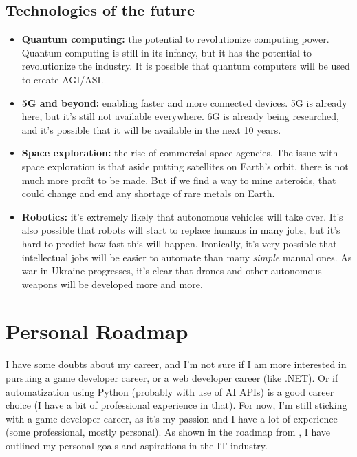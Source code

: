\documentclass{article}
\begin{document}
\subsection{Technologies of the future}
\begin{itemize}
    \item \textbf{Quantum computing:} the potential to revolutionize computing power. Quantum computing is still in its infancy, but it has the potential to revolutionize the industry. It is possible that quantum computers will be used to create AGI/ASI.
    \item \textbf{5G and beyond:} enabling faster and more connected devices. 5G is already here, but it's still not available everywhere. 6G is already being researched, and it's possible that it will be available in the next 10 years.
    \item \textbf{Space exploration:} the rise of commercial space agencies. The issue with space exploration is that aside putting satellites on Earth's orbit, there is not much more profit to be made. But if we find a way to mine asteroids, that could change and end any shortage of rare metals on Earth.
    \item \textbf{Robotics:} it's extremely likely that autonomous vehicles will take over. It's also possible that robots will start to replace humans in many jobs, but it's hard to predict how fast this will happen. Ironically, it's very possible that intellectual jobs will be easier to automate than many \textit{simple} manual ones. As war in Ukraine progresses, it's clear that drones and other autonomous weapons will be developed more and more.
\end{itemize}

\section{Personal Roadmap}
I have some doubts about my career, and I'm not sure if I am more interested in pursuing a game developer career, or a web developer career (like .NET). Or if automatization using Python (probably with use of AI APIs) is a good career choice (I have a bit of professional experience in that). For now, I'm still sticking with a game developer career, as it's my passion and I have a lot of experience (some professional, mostly personal). As shown in the roadmap from \textcite{game-developer-roadmap}, I have outlined my personal goals and aspirations in the IT industry.
\end{document}

